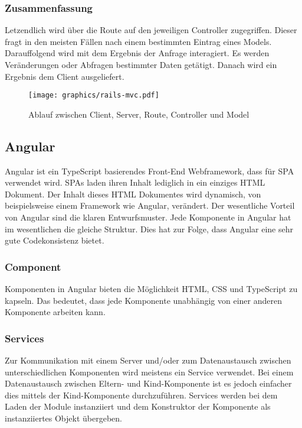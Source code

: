 \subsubsection{Zusammenfassung}
\label{sec: rails_resuemee}
Letzendlich wird über die Route auf den jeweiligen Controller zugegriffen. Dieser fragt in den meisten Fällen nach einem bestimmten Eintrag eines Models. Darauffolgend wird mit dem Ergebnis der Anfrage interagiert. Es werden Veränderungen oder Abfragen bestimmter Daten getätigt. Danach wird ein Ergebnis dem Client ausgeliefert.

\begin{figure}[h]
	\texttt{[image: graphics/rails-mvc.pdf]}
	\caption{Ablauf zwischen Client, Server, Route, Controller und Model}
	\label{fig:rails-mvc}
\end{figure}


\subsection{Angular}
\label{sec: angular}
Angular ist ein TypeScript basierendes Front-End Webframework, dass für \gls{SPA} verwendet wird. \gls{SPA}s laden ihren Inhalt lediglich in ein einziges \gls{HTML} Dokument. Der Inhalt dieses \gls{HTML} Dokumentes wird dynamisch, von beispielsweise einem Framework wie Angular, verändert. Der wesentliche Vorteil von Angular sind die klaren Entwurfsmuster. Jede Komponente in Angular hat im wesentlichen die gleiche Struktur. Dies hat zur Folge, dass Angular eine sehr gute Codekonsistenz bietet.

\subsubsection{Component}
\label{sec: ang-component}
Komponenten in Angular bieten die Möglichkeit \gls{HTML}, \gls{CSS} und TypeScript zu kapseln. Das bedeutet, dass jede Komponente unabhängig von einer anderen Komponente arbeiten kann.


\subsubsection{Services}
\label{sec: ang-service}
Zur Kommunikation mit einem Server und/oder zum Datenaustausch zwischen unterschiedlichen Komponenten wird meistens ein Service verwendet. Bei einem Datenaustausch zwischen Eltern- und Kind-Komponente ist es jedoch einfacher dies mittels der Kind-Komponente durchzuführen. Services werden bei dem Laden der Module instanziiert und dem Konstruktor der Komponente als instanziiertes Objekt übergeben.


